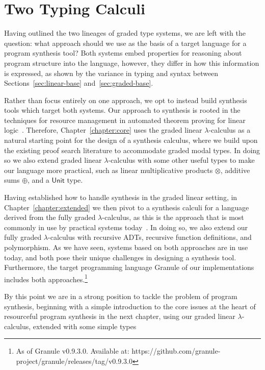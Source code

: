 \section{Two Typing Calculi}
\label{sec:two-typing}
Having outlined the two lineages of graded type systems, we are left with the
question: what approach should we use as the basis of a target language for a
program synthesis tool? Both systems embed properties for reasoning about
program structure into the language, however, they differ in how this
information is expressed, as shown by the variance in typing and syntax between
Sections~\ref{sec:linear-base} and~\ref{sec:graded-base}. 

Rather than focus entirely on one approach, we opt to instead build synthesis
tools which target both systems. Our approach to synthesis is rooted in the
techniques for resource management in automated theorem proving for linear
logic~\citep{HODAS1994327, CERVESATO2000133}. Therefore,
Chapter~\ref{chapter:core} uses the graded linear $\lambda$-calculus as a
natural starting point for the design of a synthesis calculus, where we build
upon the existing proof search literature to accommodate graded modal types.
In doing so we also extend graded linear $\lambda$-calculus with some other useful types
to make our language more practical, such as linear multiplicative products
$\otimes$, additive sums $\oplus$, and a $\mathsf{Unit}$ type.

Having established how to handle synthesis in the graded linear setting, in
Chapter~\ref{chapter:extended} we then pivot to a synthesis calculi for a
language derived from the fully graded $\lambda$-calculus, as this is the
approach that is most commonly in use by practical systems
today~\citep{DBLP:journals/corr/abs-2104-00480,
DBLP:journals/pacmpl/BernardyBNJS18}. In doing so, we also extend our fully
graded $\lambda$-calculus with recursive ADTs, recursive function definitions,
and polymorphism. As we have seen, systems based on both approaches are in use
today, and both pose their unique challenges in designing a synthesis tool.
Furthermore, the target programming language Granule of our implementations
includes both approaches.\footnote{As of Granule v0.9.3.0. Available at:
https://github.com/granule-project/granule/releases/tag/v0.9.3.0}

By this point we are in a strong position to tackle the problem of program
synthesis, beginning with a simple introduction to the core issues at the heart
of resourceful program synthesis in the next chapter, using our graded linear
$\lambda$-calculus, extended with some simple types 

